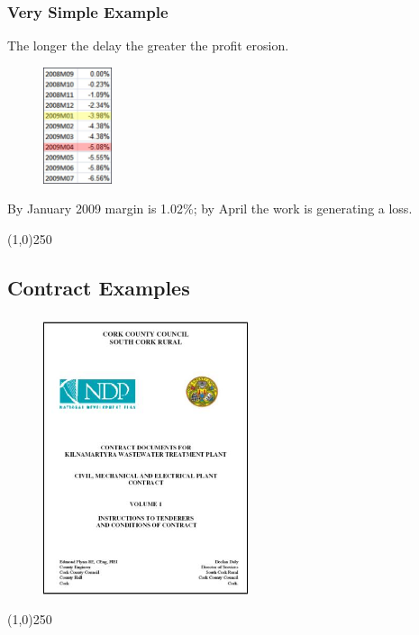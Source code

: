 \begin{frame}
\frametitle{Very Simple Example}
The longer the delay the greater the profit erosion.\\
\begin{figure}
	\centering
		\includegraphics[width = 2cm]{images/proferos.jpg}
	\label{fig:proferos}
\end{figure}
By January 2009 margin is 1.02\%; by April the work is generating a loss.
\end{frame}
\begin{center}\line(1,0){250}\end{center}







\subsection{Contract Examples}

\begin{frame}
\frametitle{}



\begin{figure}
	\centering
		\includegraphics[width = 6cm]{images/contcvr.jpg}
	\label{fig:contcvr}
\end{figure}
\end{frame}
\begin{center}\line(1,0){250}\end{center}






